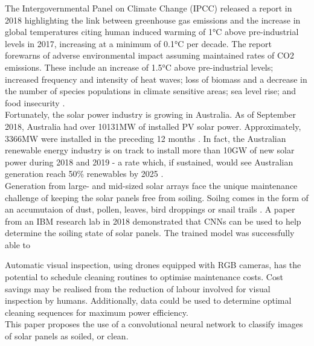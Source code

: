 \documentclass[10pt,journal,compsoc]{IEEEtran}
\begin{document}
		The Intergovernmental Panel on Climate Change (IPCC) released a report in 2018 highlighting the link between greenhouse gas emissions and the increase in global temperatures citing human induced warming of 1$\si{\celsius}$ above pre-industrial levels in 2017, increasing at a minimum of 0.1$ \si{\celsius}$ per decade. The report forewarns of adverse environmental impact assuming maintained rates of CO2 emissions. These include an increase of 1.5$ \si{\celsius}$ above pre-industrial levels; increased frequency and intensity of heat waves; loss of biomass and a decrease in the number of species populations in climate sensitive areas; sea level rise; and food insecurity \cite{IPCC:2018}.\\ 
		
		Fortunately, the solar power industry is growing in Australia. As of September 2018, Australia had over 10131$\si{\mega\watt}$ of installed PV solar power. Approximately, 3366$\si{\mega\watt}$ were installed in the preceding 12 months \cite{APVI:2018}. In fact, the Australian renewable energy industry is on track to install more than 10$\si{\giga\watt}$ of new solar power during 2018 and 2019 - a rate which, if sustained, would see Australian generation reach 50\% renewables by 2025 \cite{Baldwin:2018}.\\
		
		Generation from large- and mid-sized solar arrays face the unique maintenance challenge of keeping the solar panels free from soiling. Soilng comes in the form of an accumutaion of dust, pollen, leaves, bird droppings or snail trails \cite{Maghami:2016}. A paper from an IBM research lab in 2018 demonstrated that CNNs can be used to help determine the soiling state of solar panels. The trained model was successfully able to 
		
		
		Automatic visual inspection, using drones equipped with RGB cameras, has the potential to schedule cleaning routines to optimise maintenance costs. Cost savings may be realised from the reduction of labour involved for visual inspection by humans. Additionally, data could be used to determine optimal cleaning sequences for maximum power efficiency.\\
		
		This paper proposes the use of a convolutional neural network to classify images of solar panels as soiled, or clean.\\
		
		 
		
		
\end{document}
